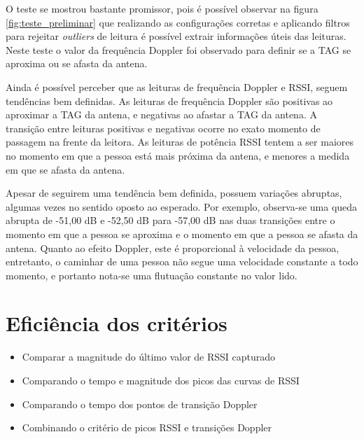  O teste se mostrou bastante promissor, pois é possível observar na figura \ref{fig:teste_preliminar} que realizando as configurações corretas e aplicando filtros para rejeitar \textit{outliers} de leitura é possível extrair informações úteis das leituras. Neste teste o valor da frequência Doppler foi observado para definir se a TAG se aproxima ou se afasta da antena.
 
 Ainda é possível perceber que as leituras de frequência Doppler e RSSI, seguem tendências bem definidas. As leituras de frequência Doppler são positivas ao aproximar a TAG da antena, e negativas ao afastar a TAG da antena. A transição entre leituras positivas e negativas ocorre no exato momento de passagem na frente da leitora. As leituras de potência RSSI tentem a ser maiores no momento em que a pessoa está mais próxima da antena, e menores a medida em que se afasta da antena.
 
 Apesar de seguirem uma tendência bem definida, possuem variações abruptas, algumas vezes no sentido oposto ao esperado. Por exemplo, observa-se uma queda abrupta de -51,00 dB e -52,50 dB para -57,00 dB nas duas transições entre o momento em que a pessoa se aproxima e o momento em que a pessoa se afasta da antena. Quanto ao efeito Doppler, este é proporcional à velocidade da pessoa, entretanto, o caminhar de uma pessoa não segue uma velocidade constante a todo momento, e portanto nota-se uma flutuação constante no valor lido.

\section{Eficiência dos critérios}

\begin{itemize}
    \item Comparar a magnitude do último valor de RSSI capturado
    \item Comparando o tempo e magnitude dos picos das curvas de RSSI
    \item Comparando o tempo dos pontos de transição Doppler
    \item Combinando o critério de picos RSSI e transições Doppler
\end{itemize}

